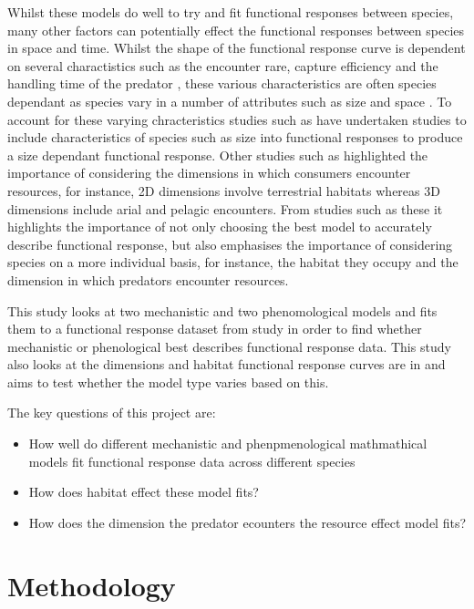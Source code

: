 \documentclass[11pt]{article}
\begin{document}
Whilst these models do well to try and fit functional responses between species, many other factors can potentially effect the functional responses between species in space and time. Whilst the shape of the functional response curve is dependent on several charactistics such as the encounter rare, capture efficiency and the handling time of the predator \cite{Holling1965}, these various characteristics are often species dependant as species vary in a number of attributes such as size and space \cite{Elliott2003}. To account for these varying chracteristics studies such as \cite{Aljetlawi2004}  have undertaken studies to include characteristics of species such as size into functional responses to produce a size dependant functional response. Other studies such as \cite{Pawar2012} highlighted the importance of considering the dimensions in which consumers encounter resources, for instance, 2D dimensions involve terrestrial habitats whereas 3D dimensions include arial and pelagic encounters. From studies such as these it highlights the importance of not only choosing the best model to accurately describe functional response, but also emphasises the importance of considering species on a more individual basis, for instance, the habitat they occupy and the dimension in which predators encounter resources. 

This study looks at two mechanistic and two phenomological models and fits them to a functional response dataset from \cite{Pawar2012} study in order to find whether mechanistic or phenological best describes functional response data. This study also looks at the dimensions and habitat functional response curves are in and aims to test whether the model type varies based on this. 

The key questions of this project are:
	\begin{itemize}
	\item How well do different mechanistic and phenpmenological mathmathical models fit functional response data across different species
	\item How does habitat effect these model fits? 
	\item How does the dimension the predator ecounters the resource effect model fits? 
	\end{itemize}


	\section{Methodology}
\noindent
\end{document}
